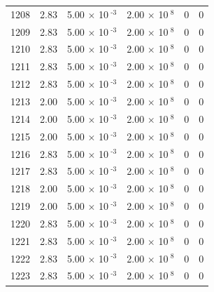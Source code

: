 \documentclass[a4paper,11pt]{article}
\begin{document}
\begin{center}
\begin{longtable}{|R{1.5cm}|R{2.4cm}|R{2.4cm}|R{2.4cm}|R{2.4cm}|R{2.4cm}|}
 1208 &   2.83  &         5.00 $\times$ 10$^{\text{          -3}}$  &         2.00 $\times$ 10$^{\text{           8}}$  & 0  & 0 \\
 1209 &   2.83  &         5.00 $\times$ 10$^{\text{          -3}}$  &         2.00 $\times$ 10$^{\text{           8}}$  & 0  & 0 \\
 1210 &   2.83  &         5.00 $\times$ 10$^{\text{          -3}}$  &         2.00 $\times$ 10$^{\text{           8}}$  & 0  & 0 \\
 1211 &   2.83  &         5.00 $\times$ 10$^{\text{          -3}}$  &         2.00 $\times$ 10$^{\text{           8}}$  & 0  & 0 \\
 1212 &   2.83  &         5.00 $\times$ 10$^{\text{          -3}}$  &         2.00 $\times$ 10$^{\text{           8}}$  & 0  & 0 \\
 1213 &   2.00  &         5.00 $\times$ 10$^{\text{          -3}}$  &         2.00 $\times$ 10$^{\text{           8}}$  & 0  & 0 \\
 1214 &   2.00  &         5.00 $\times$ 10$^{\text{          -3}}$  &         2.00 $\times$ 10$^{\text{           8}}$  & 0  & 0 \\
 1215 &   2.00  &         5.00 $\times$ 10$^{\text{          -3}}$  &         2.00 $\times$ 10$^{\text{           8}}$  & 0  & 0 \\
 1216 &   2.83  &         5.00 $\times$ 10$^{\text{          -3}}$  &         2.00 $\times$ 10$^{\text{           8}}$  & 0  & 0 \\
 1217 &   2.83  &         5.00 $\times$ 10$^{\text{          -3}}$  &         2.00 $\times$ 10$^{\text{           8}}$  & 0  & 0 \\
 1218 &   2.00  &         5.00 $\times$ 10$^{\text{          -3}}$  &         2.00 $\times$ 10$^{\text{           8}}$  & 0  & 0 \\
 1219 &   2.00  &         5.00 $\times$ 10$^{\text{          -3}}$  &         2.00 $\times$ 10$^{\text{           8}}$  & 0  & 0 \\
 1220 &   2.83  &         5.00 $\times$ 10$^{\text{          -3}}$  &         2.00 $\times$ 10$^{\text{           8}}$  & 0  & 0 \\
 1221 &   2.83  &         5.00 $\times$ 10$^{\text{          -3}}$  &         2.00 $\times$ 10$^{\text{           8}}$  & 0  & 0 \\
 1222 &   2.83  &         5.00 $\times$ 10$^{\text{          -3}}$  &         2.00 $\times$ 10$^{\text{           8}}$  & 0  & 0 \\
 1223 &   2.83  &         5.00 $\times$ 10$^{\text{          -3}}$  &         2.00 $\times$ 10$^{\text{           8}}$  & 0  & 0 \\

\end{longtable}
\end{center}
\end{document}
